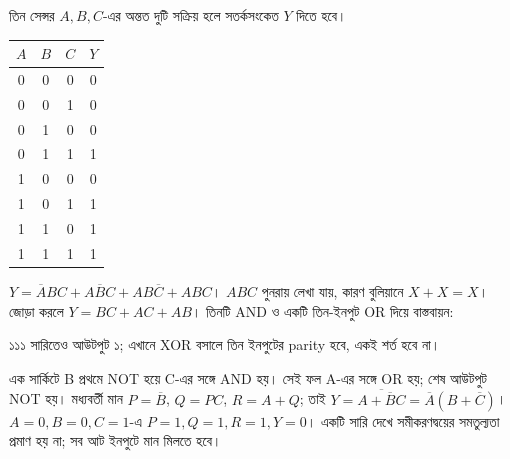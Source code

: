 তিন সেন্সর $A,B,C$-এর অন্তত দুটি সক্রিয় হলে সতর্কসংকেত $Y$ দিতে হবে।
\begin{center}\begin{tabular}{|c|c|c|c|}\hline
$A$&$B$&$C$&$Y$\\\hline
0&0&0&0\\\hline0&0&1&0\\\hline0&1&0&0\\\hline0&1&1&1\\\hline
1&0&0&0\\\hline1&0&1&1\\\hline1&1&0&1\\\hline1&1&1&1\\\hline
\end{tabular}\end{center}
\chThreeAnswer $Y=\overline ABC+A\overline BC+AB\overline C+ABC$। $ABC$ পুনরায় লেখা যায়, কারণ বুলিয়ানে $X+X=X$। জোড়া করলে $Y=BC+AC+AB$। তিনটি AND ও একটি তিন-ইনপুট OR দিয়ে বাস্তবায়ন:
\begin{center}
\begin{minipage}{\linewidth}\centering\begin{chThreeDiagram}\end{chThreeDiagram}

\end{minipage}
\end{center}
১১১ সারিতেও আউটপুট ১; এখানে XOR বসালে তিন ইনপুটের parity হবে, একই শর্ত হবে না।

এক সার্কিটে B প্রথমে NOT হয়ে C-এর সঙ্গে AND হয়। সেই ফল A-এর সঙ্গে OR হয়; শেষ আউটপুট NOT হয়।
\chThreeAnswer মধ্যবর্তী মান $P=\overline B$, $Q=PC$, $R=A+Q$; তাই $Y=\overline{A+\overline BC}=\overline A(B+\overline C)$। $A=0,B=0,C=1$-এ $P=1,Q=1,R=1,Y=0$। একটি সারি দেখে সমীকরণদ্বয়ের সমতুল্যতা প্রমাণ হয় না; সব আট ইনপুটে মান মিলতে হবে।


